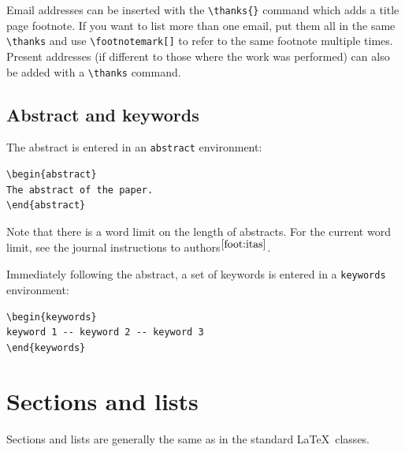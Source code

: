 \documentclass[fleqn,usenatbib,useAMS]{rasti}
\begin{document}
Email addresses can be inserted with the \verb'\thanks{}' command which adds a title page footnote.
If you want to list more than one email, put them all in the same \verb'\thanks' and use \verb'\footnotemark[]' to refer to the same footnote multiple times.
Present addresses (if different to those where the work was performed) can also be added with a \verb'\thanks' command.

\subsection{Abstract and keywords}

The abstract is entered in an \verb'abstract' environment:
\begin{verbatim}
\begin{abstract}
The abstract of the paper.
\end{abstract}
\end{verbatim}
\noindent Note that there is a word limit on the length of abstracts.
For the current word limit, see the journal instructions to authors$^{\ref{foot:itas}}$.

Immediately following the abstract, a set of keywords is entered in a \verb'keywords' environment:
\begin{verbatim}
\begin{keywords}
keyword 1 -- keyword 2 -- keyword 3
\end{keywords}
\end{verbatim}

\section{Sections and lists}

Sections and lists are generally the same as in the standard \LaTeX\ classes.
\end{document}
